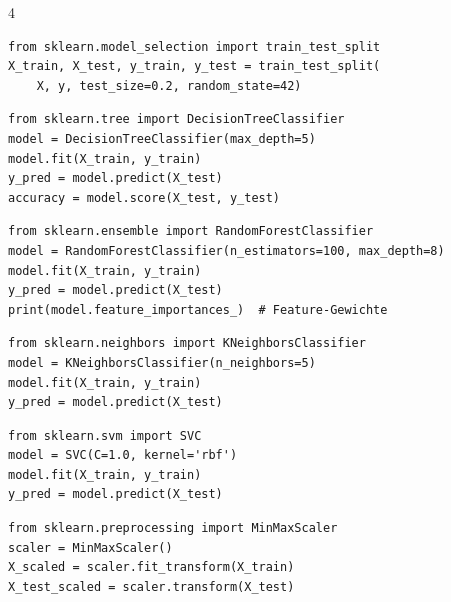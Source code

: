 \begin{landscape}
\begin{multicols*}{4}
		\begin{cheatSheetBox}[title=Train-Test-Split]
			\begin{lstlisting}
from sklearn.model_selection import train_test_split
X_train, X_test, y_train, y_test = train_test_split(
    X, y, test_size=0.2, random_state=42)
			\end{lstlisting}
		\end{cheatSheetBox}

		\begin{cheatSheetBox}[title=Entscheidungsbaum]
			\begin{lstlisting}
from sklearn.tree import DecisionTreeClassifier
model = DecisionTreeClassifier(max_depth=5)
model.fit(X_train, y_train)
y_pred = model.predict(X_test)
accuracy = model.score(X_test, y_test)
			\end{lstlisting}
		\end{cheatSheetBox}

		\begin{cheatSheetBox}[title=Random Forest]
			\begin{lstlisting}
from sklearn.ensemble import RandomForestClassifier
model = RandomForestClassifier(n_estimators=100, max_depth=8)
model.fit(X_train, y_train)
y_pred = model.predict(X_test)
print(model.feature_importances_)  # Feature-Gewichte
			\end{lstlisting}
		\end{cheatSheetBox}

		\begin{cheatSheetBox}[title=KNN]
			\begin{lstlisting}
from sklearn.neighbors import KNeighborsClassifier
model = KNeighborsClassifier(n_neighbors=5)
model.fit(X_train, y_train)
y_pred = model.predict(X_test)
			\end{lstlisting}
		\end{cheatSheetBox}

		\begin{cheatSheetBox}[title=SVM]
			\begin{lstlisting}
from sklearn.svm import SVC
model = SVC(C=1.0, kernel='rbf')
model.fit(X_train, y_train)
y_pred = model.predict(X_test)
			\end{lstlisting}
		\end{cheatSheetBox}

		\begin{cheatSheetBox}[title=Normalisierung]
			\begin{lstlisting}
from sklearn.preprocessing import MinMaxScaler
scaler = MinMaxScaler()
X_scaled = scaler.fit_transform(X_train)
X_test_scaled = scaler.transform(X_test)
			\end{lstlisting}
		\end{cheatSheetBox}


\end{multicols*}
\end{landscape}
